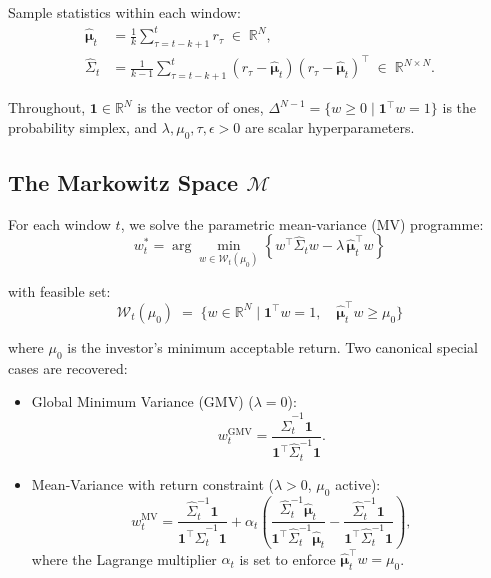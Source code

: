 \documentclass[preprint,12pt]{elsarticle}
\theoremstyle{plain}
\theoremstyle{definition}
\newcommand{\R}{\mathbb{R}}
\newcommand{\calW}{\mathcal{W}}
\newcommand{\bmu}{\bm{\mu}}
\newcommand{\bone}{\mathbf{1}}
\begin{document}
\noindent Sample statistics within each window:
\begin{align}
  \hat{\bmu}_t &= \frac{1}{k}\sum_{\tau=t-k+1}^{t} r_\tau
  \;\in\; \R^N, \label{eq:sample_mean}\\
  \hat{\Sigma}_t &= \frac{1}{k-1}\sum_{\tau=t-k+1}^{t}
    (r_\tau - \hat{\bmu}_t)(r_\tau - \hat{\bmu}_t)^\top
  \;\in\; \R^{N\times N}. \label{eq:sample_cov}
\end{align}

Throughout, $\bone \in \R^N$ is the vector of ones,
$\Delta^{N-1} = \{w \ge 0 \mid \bone^\top w = 1\}$ is the probability simplex, and
$\lambda, \mu_0, \tau, \epsilon > 0$ are scalar hyperparameters.

\subsection{The Markowitz Space \texorpdfstring{$\mathcal{M}$}{M}}

For each window $t$, we solve the parametric mean-variance (MV) programme:
\begin{equation}
	w_t^{*}
	=
	\arg\min_{w \in \mathcal{W}_t(\mu_0)}
	\left\{
	w^\top \hat{\Sigma}_t w
	-
	\lambda\,\hat{\boldsymbol{\mu}}_t^\top w
	\right\}
	\label{eq:mv_main}
\end{equation}

with feasible set:
\begin{equation}
	\calW_t(\mu_0) \;=\;
	\bigl\{ w \in \R^N \;\big|\;
	\bone^\top w = 1,\quad
	\hat{\bmu}_t^\top w \ge \mu_0
	\bigr\}
	\label{eq:feasible_set}
\end{equation}

where $\mu_0$ is the investor's minimum acceptable return.  Two canonical
special cases are recovered:

\begin{itemize}
	\item {Global Minimum Variance (GMV)} ($\lambda = 0$):
	\begin{equation}
		w_t^{\text{GMV}} = \frac{\hat{\Sigma}_t^{-1}\bone}
		{\bone^\top \hat{\Sigma}_t^{-1}\bone}.
		\label{eq:gmv}
	\end{equation}
	
	\item {Mean-Variance with return constraint} ($\lambda > 0$, $\mu_0$ active):
	\begin{equation}
		w_t^{\text{MV}} =
		\frac{\hat{\Sigma}_t^{-1}\bone}{\bone^\top\hat{\Sigma}_t^{-1}\bone}
		+ \alpha_t\!\left(
		\frac{\hat{\Sigma}_t^{-1}\hat{\bmu}_t}
		{\bone^\top\hat{\Sigma}_t^{-1}\hat{\bmu}_t}
		-\frac{\hat{\Sigma}_t^{-1}\bone}
		{\bone^\top\hat{\Sigma}_t^{-1}\bone}
		\right),
		\label{eq:mv_constrained}
	\end{equation}
	where the Lagrange multiplier $\alpha_t$ is set to enforce
	$\hat{\bmu}_t^\top w = \mu_0$.
\end{itemize}
\end{document}
